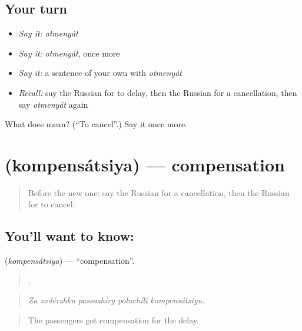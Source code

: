 \subsection*{Your turn}
\begin{itemize}
\raggedright
  \item \emph{Say it:} \emph{otmenyát}
  \item \emph{Say it:} \emph{otmenyát}, once more
  \item \emph{Say it:} a sentence of your own with \emph{otmenyát}
  \item \emph{Recall:} say the Russian for to delay, then the Russian for a cancellation, then say \emph{otmenyát} again
\end{itemize}

\begin{tcolorbox}[breakable,colback=teal!4,colframe=teal!35!black,title={Before you move on}]
What does  mean? (\textquotedblleft{}To cancel\textquotedblright{}.) Say it once more.
\end{tcolorbox}
\section[\texorpdfstring{\ru{компенсация} (kompensátsiya)}{компенсация (kompensátsiya)}]{ (kompensátsiya) — compensation}

\label{lesson:RU-C423-kompensatsiya}



\begin{quote}
Before the new one: say the Russian for a cancellation, then the Russian for to cancel.
\end{quote}

\subsection*{You'll want to know: }
\textbf{} (\emph{kompensátsiya}) — \textquotedblleft{}compensation\textquotedblright{}.

\begin{quote}
    .
\end{quote}

\begin{quote}
\emph{Za zadérzhku passazhíry poluchíli kompensátsiyu.}
\end{quote}

\begin{quote}
The passengers got compensation for the delay.
\end{quote}

